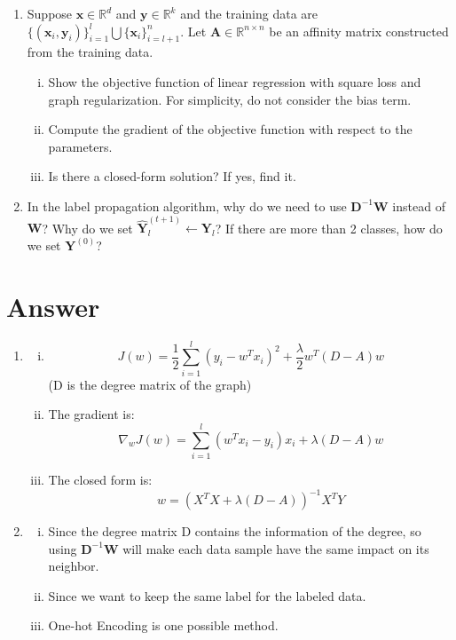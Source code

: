 \documentclass[
	12pt, %
]{fphw}
\begin{document}
\begin{problem}
	\begin{enumerate}
	\item
    Suppose $\mathbf{x}\in\mathbb{R}^d$ and $\mathbf{y}\in\mathbb{R}^k$ and the training data are $\{(\mathbf{x}_i,\mathbf{y}_i)\}_{i=1}^l\bigcup\{\mathbf{x}_i\}_{i=l+1}^n$. Let $\mathbf{A}\in\mathbb{R}^{n\times n}$ be an affinity matrix constructed from the training data. 
	\begin{enumerate}[i)]
	\item Show the objective function of linear regression with square loss and graph regularization. For simplicity, do not consider the bias term. 
	\item Compute the gradient of the objective function with respect to the parameters. 
	\item Is there a closed-form solution? If yes, find it.
\end{enumerate}
    \item In the label propagation algorithm, why do we need to use $\mathbf{D}^{-1}\mathbf{W}$ instead of $\mathbf{W}$? Why do we set $\hat{\mathbf{Y}}_l^{(t+1)} \leftarrow \mathbf{Y}_l$? If there are more than 2 classes, how do we set $\mathbf{Y}^{(0)}$? 
\end{enumerate}
\end{problem}
\section*{Answer}
\begin{enumerate}
	\item\begin{enumerate}[i)]
	\item 
\[ J(w) = \frac{1}{2} \sum_{i=1}^l (y_i - w^T x_i)^2 + \frac{\lambda}{2} w^T (D-A) w \](D is the degree matrix of the graph)
\item The gradient is: \[ \nabla_w J(w) = \sum_{i=1}^l (w^T x_i - y_i) x_i + \lambda (D-A) w \]
\item The closed form is: \[ w = (X^T X + \lambda (D-A))^{-1} X^T Y \]
\end{enumerate}
\item \begin{enumerate}[i)]
	\item Since the degree matrix D contains the information of the degree, so using $\mathbf{D}^{-1}\mathbf{W}$ will make each data sample have the same impact on its neighbor.
	\item Since we want to keep the same label for the labeled data.
	\item One-hot Encoding is one possible method.
\end{enumerate}
\end{enumerate}
\end{document}
